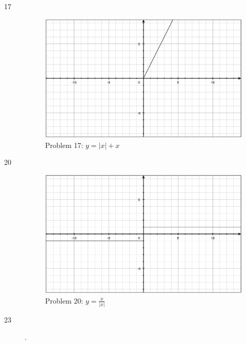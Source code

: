 \documentclass{exam}
\begin{document}
\begin{description}
    \item[17]
      \begin{figure}[H]
        \centering
        \includegraphics[scale=.3]{section_2.2/problem17.eps}
        \caption*{Problem 17: $y = |x| + x$}
      \end{figure}

    \item[20]
      \begin{figure}[H]
        \centering
        \includegraphics[scale=.3]{section_2.2/problem20.eps}
        \caption*{Problem 20: $y = \frac{x}{|x|}$}
      \end{figure}

    \item[23].
      
\end{description}
\end{document}

